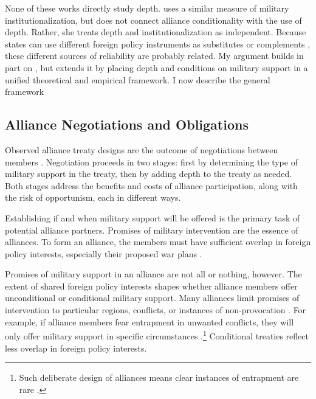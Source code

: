 \documentclass[12pt]{article}
\begin{document}
None of these works directly study depth. 
\citet{Mattes2012} uses a similar measure of military institutionalization, but does not connect alliance conditionality with the use of depth. 
Rather, she treats depth and institutionalization as independent. 
Because states can use different foreign policy instruments as substitutes or complements \citep{Starr2000, MorganPalmer2000}, these different sources of reliability are probably related. 
My argument builds in part on \citet{Mattes2012}, but extends it by placing depth and conditions on military support in a unified theoretical and empirical framework. 
I now describe the general framework 

\subsection{Alliance Negotiations and Obligations}

Observed alliance treaty designs are the outcome of negotiations between members \citep{Poast2019a}.  
Negotiation proceeds in two stages: first by determining the type of military support in the treaty, then by adding depth to the treaty as needed. 
Both stages address the benefits and costs of alliance participation, along with the risk of opportunism, each in different ways. 


Establishing if and when military support will be offered is the primary task of potential alliance partners. 
Promises of military intervention are the essence of alliances. 
To form an alliance, the members must have sufficient overlap in foreign policy interests, especially their proposed war plans \citep{Morrow1991, Smith1995, FordhamPoast2014, Poast2019a}.  


Promises of military support in an alliance are not all or nothing, however. 
The extent of shared foreign policy interests shapes whether alliance members offer unconditional or conditional military support.
Many alliances limit promises of intervention to particular regions, conflicts, or instances of non-provocation \citep{Leedsetal2000}. 
For example, if alliance members fear entrapment in unwanted conflicts, they will only offer military support in specific circumstances \citep{Kim2011, Benson2012}.\footnote{Such deliberate design of alliances means clear instances of entrapment are rare \citep{Beckley2015}.} 
Conditional treaties reflect less overlap in foreign policy interests. 
\end{document}
